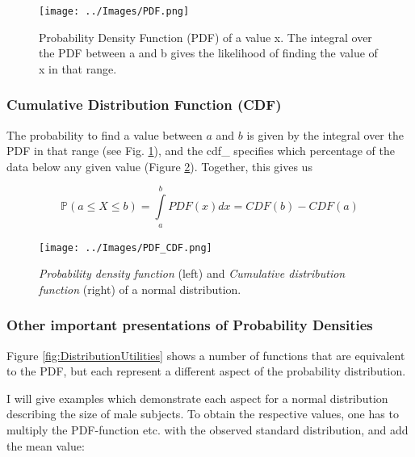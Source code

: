 \begin{figure}
  \centering
  \texttt{[image: ../Images/PDF.png]}\\
  \caption{Probability Density Function (PDF) of a value x. The integral over the PDF between a and b gives the likelihood of finding the value of x in that range.}\label{fig:PDF}
\end{figure}

\subsubsection{Cumulative Distribution Function (CDF)}

The probability to find a value between $a$ and $b$ is given by the integral over the PDF in that range (see Fig. \ref{fig:PDF}), and the \gls{cdf_}  specifies which percentage of the data below any given value (Figure \ref{fig:CDF}). Together, this gives us

\begin{equation}
   \mathbb{P}(a \leq X \leq b) = \int\limits_a^b {PDF(x)dx} = CDF(b) - CDF(a)
\end{equation}


\begin{figure}[ht]
  \centering
  \texttt{[image: ../Images/PDF\_CDF.png]}\\
  \caption{\emph{Probability density function} (left) and \emph{Cumulative distribution function} (right) of a normal distribution.}\label{fig:CDF}
\end{figure}

\subsubsection{Other important presentations of Probability Densities}

Figure \ref{fig:DistributionUtilities} shows a number of functions that are equivalent to the PDF, but each represent a different aspect of the probability distribution.

I will give examples which demonstrate each aspect for a normal distribution describing the size of male subjects. To obtain the respective values, one has to multiply the PDF-function etc. with the observed standard distribution, and add the mean value:

